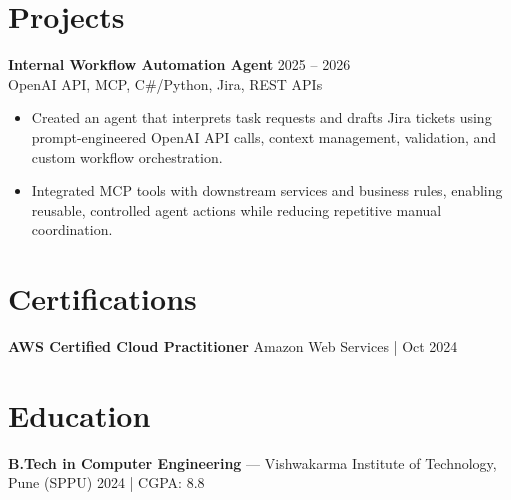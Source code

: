 \documentclass[10pt,letterpaper]{article}
\newcommand{\resumeSubheading}[4]{%
  \textbf{#1} \hfill #2 \\
  #3 \hfill #4 \\
}
\begin{document}
\section*{Projects}
\resumeSubheading{Internal Workflow Automation Agent}{2025 -- 2026}{}{OpenAI API, MCP, C\#/Python, Jira, REST APIs}
\begin{itemize}
    \item Created an agent that interprets task requests and drafts Jira tickets using prompt-engineered OpenAI API calls, context management, validation, and custom workflow orchestration.
    \item Integrated MCP tools with downstream services and business rules, enabling reusable, controlled agent actions while reducing repetitive manual coordination.
\end{itemize}

\section*{Certifications}
\textbf{AWS Certified Cloud Practitioner} \hfill Amazon Web Services \;|\; Oct 2024

\section*{Education}
\textbf{B.Tech in Computer Engineering} --- Vishwakarma Institute of Technology, Pune (SPPU) \hfill 2024 \;|\; CGPA: 8.8
\end{document}
